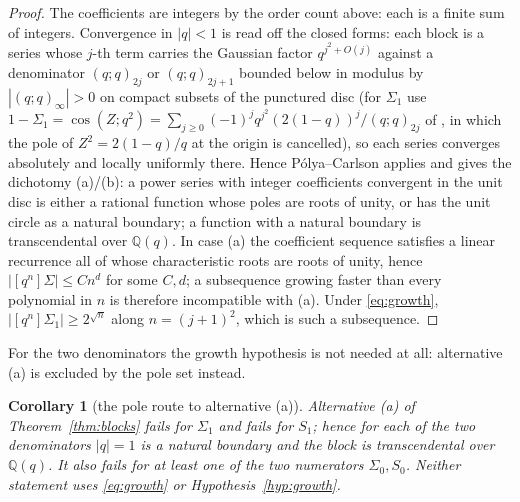 \documentclass[11pt]{article}
\theoremstyle{plain}
\newtheorem{corollary}[theorem]{Corollary}
\theoremstyle{definition}
\theoremstyle{remark}
\newcommand{\Q}{\mathbb{Q}}
\begin{document}
\begin{proof}
The coefficients are integers by the order count above: each is a finite sum of integers.
Convergence in $|q|<1$ is read off the closed forms: each block is a series whose $j$-th term carries the
Gaussian factor $q^{j^2+O(j)}$ against a denominator $(q;q)_{2j}$ or $(q;q)_{2j+1}$ bounded below
in modulus by $|(q;q)_\infty|>0$ on compact subsets of the punctured disc (for $\Sigma_1$ use
$1-\Sigma_1=\cos(Z;q^2)=\sum_{j\ge0}(-1)^jq^{j^2}(2(1-q))^j/(q;q)_{2j}$ of
{\cite[Proposition \textup{prop:qtrig}]{Bonfioli2026bA}}, in which the pole of $Z^2=2(1-q)/q$ at the origin is cancelled), so
each series converges absolutely and locally uniformly there. Hence
P\'olya--Carlson \cite{Carlson1921} applies and gives the dichotomy \textup{(a)}/\textup{(b)}: a
power series with integer coefficients convergent in the unit disc is either a rational function
whose poles are roots of unity, or has the unit circle as a natural boundary; a function with a
natural boundary is transcendental over $\Q(q)$. In case \textup{(a)} the coefficient sequence
satisfies a linear recurrence all of whose characteristic roots are roots of unity, hence
$|[q^n]\Sigma|\le Cn^d$ for some $C,d$; a subsequence growing faster than every polynomial in $n$
is therefore incompatible with \textup{(a)}. Under \eqref{eq:growth},
$|[q^n]\Sigma_1|\ge2^{\sqrt n}$ along $n=(j+1)^2$, which is such a subsequence.
\end{proof}

For the two denominators the growth hypothesis is not needed at all: alternative \textup{(a)} is
excluded by the pole set instead.

\begin{corollary}[the pole route to alternative \textup{(a)}]\label{cor:polepath}
Alternative \textup{(a)} of Theorem~\ref{thm:blocks} fails for $\Sigma_1$ and fails for $S_1$;
hence for each of the two denominators $|q|=1$ is a natural boundary and the block is transcendental
over $\Q(q)$. It also fails for at least one of the two numerators $\Sigma_0,S_0$. Neither
statement uses \eqref{eq:growth} or Hypothesis~\ref{hyp:growth}.
\end{corollary}
\end{document}
